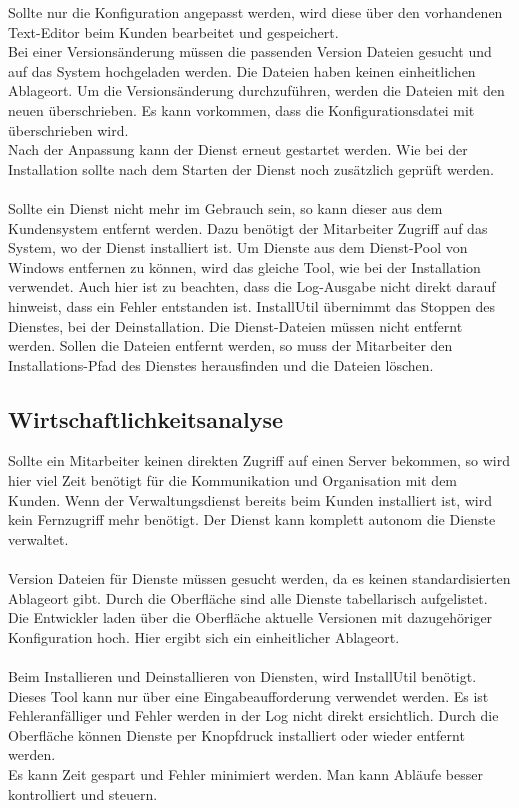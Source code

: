 Sollte nur die Konfiguration angepasst werden, wird diese über den vorhandenen Text-Editor beim Kunden bearbeitet und gespeichert.\\
Bei einer Versionsänderung müssen die passenden Version Dateien gesucht und auf das System hochgeladen werden. Die Dateien haben keinen einheitlichen Ablageort. Um die Versionsänderung durchzuführen, werden die Dateien mit den neuen überschrieben. Es kann vorkommen, dass die Konfigurationsdatei mit überschrieben wird. \\
Nach der Anpassung kann der Dienst erneut gestartet werden. Wie bei der Installation sollte nach dem Starten der Dienst noch zusätzlich geprüft werden.\\
\\
Sollte ein Dienst nicht mehr im Gebrauch sein, so kann dieser aus dem Kundensystem entfernt werden. Dazu benötigt der Mitarbeiter Zugriff auf das System, wo der Dienst installiert ist. Um Dienste aus dem Dienst-Pool von Windows entfernen zu können, wird das gleiche Tool, wie bei der Installation verwendet. Auch hier ist zu beachten, dass die Log-Ausgabe nicht direkt darauf hinweist, dass ein Fehler entstanden ist. InstallUtil übernimmt das Stoppen des Dienstes, bei der Deinstallation. Die Dienst-Dateien müssen nicht entfernt werden. Sollen die Dateien entfernt werden, so muss der Mitarbeiter den Installations-Pfad des Dienstes herausfinden und die Dateien löschen.

\subsection{Wirtschaftlichkeitsanalyse}
\label{sec:Wirtschaftlichkeitsanalyse}

Sollte ein Mitarbeiter keinen direkten Zugriff auf einen Server bekommen, so wird hier viel Zeit benötigt für die Kommunikation und Organisation mit dem Kunden. Wenn der Verwaltungsdienst bereits beim Kunden installiert ist, wird kein Fernzugriff mehr benötigt. Der Dienst kann komplett autonom die Dienste verwaltet. \\
\\
Version Dateien für Dienste müssen gesucht werden, da es keinen standardisierten Ablageort gibt. Durch die Oberfläche sind alle Dienste tabellarisch aufgelistet. Die Entwickler laden über die Oberfläche aktuelle Versionen mit dazugehöriger Konfiguration hoch. Hier ergibt sich ein einheitlicher Ablageort. \\
\\
Beim Installieren und Deinstallieren von Diensten, wird InstallUtil benötigt. Dieses Tool kann nur über eine Eingabeaufforderung verwendet werden. Es ist Fehleranfälliger und Fehler werden in der Log nicht direkt ersichtlich. Durch die Oberfläche können Dienste per Knopfdruck installiert oder wieder entfernt werden.
\\
Es kann Zeit gespart und Fehler minimiert werden. Man kann Abläufe besser kontrolliert und steuern.

